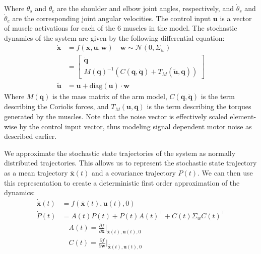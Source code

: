 \documentclass[letterpaper, 10pt, conference]{ieeeconf}
\begin{document}
Where $\theta_s$ and $\theta_e$ are the shoulder and elbow joint angles, respectively, and $\dot{\theta}_s$ and $\dot{\theta}_e$ are the corresponding joint angular velocities. The control input $\mathbf{u}$ is a vector of muscle activations for each of the 6 muscles in the model. The stochastic dynamics of the system are given by the following differential equation:
\begin{align}
    \dot{\mathbf{x}} &= f(\mathbf{x}, \mathbf{u}, \mathbf{w}) \quad \mathbf{w} \sim \mathcal{N}(0, \Sigma_w) \\
    &= \begin{bmatrix}
        \dot{\mathbf{q}} \\
        M(\mathbf{q})^{-1} \left(C(\mathbf{q}, \dot{\mathbf{q}}) + T_M(\tilde{\mathbf{u}}, \mathbf{q})\right)
    \end{bmatrix} \\
    \tilde{\mathbf{u}} &= \mathbf{u} + \text{diag}(\mathbf{u}) \cdot \mathbf{w}
\end{align}
Where $M(\mathbf{q})$ is the mass matrix of the arm model, $C(\mathbf{q}, \dot{\mathbf{q}})$ is the term describing the Coriolis forces, and $T_M(\mathbf{u}, \mathbf{q})$ is the term describing the torques generated by the muscles.
Note that the noise vector is effectively scaled element-wise by the control input vector, thus modeling signal dependent motor noise as described earlier.

We approximate the stochastic state trajectories of the system as normally distributed trajectories. This allows us to represent the stochastic state trajectory as a mean trajectory $\mathbf{\bar{x}}(t)$ and a covariance trajectory $P(t)$. We can then use this representation to create a deterministic first order approximation of the dynamics: 
\begin{align*}
    \mathbf{\dot{\bar{x}}}(t) &= f(\mathbf{\bar{x}}(t), \mathbf{u}(t), 0) \\
    \dot{P}(t) &= A(t)P(t) + P(t)A(t)^\top + C(t) \Sigma_w C(t)^\top \\
    &\quad A(t) = \frac{\partial f}{\partial \mathbf{x}}\bigg|_{\mathbf{\bar{x}}(t), \mathbf{u}(t), 0} \\
    &\quad C(t) = \frac{\partial f}{\partial \mathbf{w}}\bigg|_{\mathbf{\bar{x}}(t), \mathbf{u}(t), 0}
\end{align*}
\end{document}
